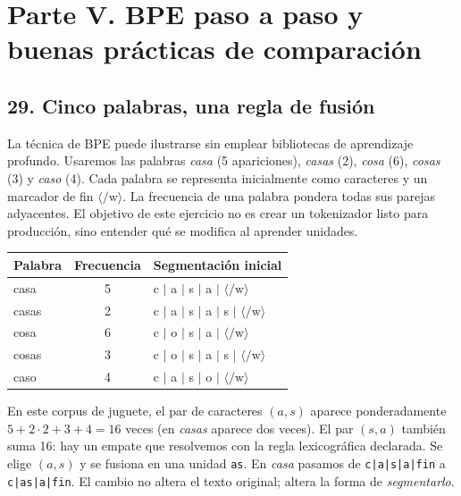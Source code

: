\chapter*{Parte V. BPE paso a paso y buenas prácticas de comparación}
\section*{29. Cinco palabras, una regla de fusión}
La técnica de BPE puede ilustrarse sin emplear bibliotecas de aprendizaje profundo. Usaremos las palabras \emph{casa} (5 apariciones), \emph{casas} (2), \emph{cosa} (6), \emph{cosas} (3) y \emph{caso} (4). Cada palabra se representa inicialmente como caracteres y un marcador de fin $\langle/\mathrm{w}\rangle$. La frecuencia de una palabra pondera todas sus parejas adyacentes. El objetivo de este ejercicio no es crear un tokenizador listo para producción, sino entender qué se modifica al aprender unidades.

\begin{center}
\begin{tabular}{lcl}\toprule
Palabra & Frecuencia & Segmentación inicial\\\midrule
casa &5& c $\mid$ a $\mid$ s $\mid$ a $\mid$ $\langle/\mathrm{w}\rangle$\\
casas &2& c $\mid$ a $\mid$ s $\mid$ a $\mid$ s $\mid$ $\langle/\mathrm{w}\rangle$\\
cosa &6& c $\mid$ o $\mid$ s $\mid$ a $\mid$ $\langle/\mathrm{w}\rangle$\\
cosas &3& c $\mid$ o $\mid$ s $\mid$ a $\mid$ s $\mid$ $\langle/\mathrm{w}\rangle$\\
caso &4& c $\mid$ a $\mid$ s $\mid$ o $\mid$ $\langle/\mathrm{w}\rangle$\\\bottomrule
\end{tabular}
\end{center}
\noindent En este corpus de juguete, el par de caracteres $(a,s)$ aparece ponderadamente $5+2\cdot2+3+4=16$ veces (en \emph{casas} aparece dos veces). El par $(s,a)$ también suma 16: hay un empate que resolvemos con la regla lexicográfica declarada. Se elige $(a,s)$ y se fusiona en una unidad \texttt{as}. En \emph{casa} pasamos de \texttt{c|a|s|a|fin} a \texttt{c|as|a|fin}. El cambio no altera el texto original; altera la forma de \emph{segmentarlo}.

